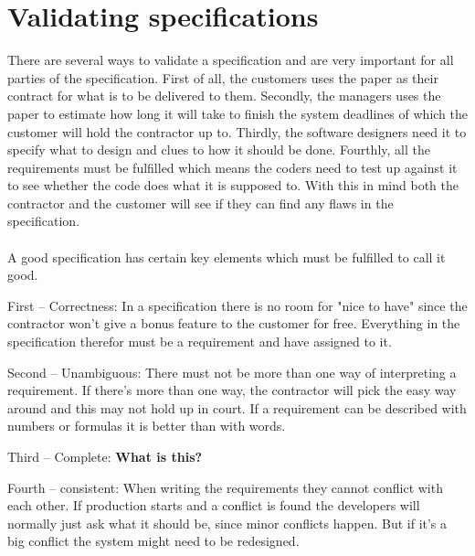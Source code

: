 \documentclass[Main]{subfiles}
\begin{document}
\section{Validating specifications}


There are several ways to validate a specification and are very important for all parties of the specification.
First of all, the customers uses the paper as their contract for what is to be delivered to them.
Secondly, the managers uses the paper to estimate how long it will take to finish the system deadlines of which the customer will hold the contractor up to.
Thirdly, the software designers need it to specify what to design and clues to how it should be done.
Fourthly, all the requirements must be fulfilled which means the coders need to test up against it to see whether the code does what it is supposed to.
With this in mind both the contractor and the customer will see if they can find any flaws in the specification.
\\
\\
A good specification has certain key elements which must be fulfilled to call it good.


First -- Correctness:
In a specification there is no room for "nice to have" since the contractor won't give a bonus  feature to the customer for free.
Everything in the specification therefor must be a requirement and have assigned to it.

Second -- Unambiguous:
There must not be more than one way of interpreting a requirement. 
If there's more than one way, the contractor will pick the easy way around and this may not hold up in court.
If a requirement can be described with numbers or formulas it is better than with words.

Third -- Complete:
\textbf{What is this?}

Fourth -- consistent:
When writing the requirements they cannot conflict with each other.
If production starts and a conflict is found the developers will normally just ask what it should be, since minor conflicts happen.
But if it's a big conflict the system might need to be redesigned. 
\end{document}
